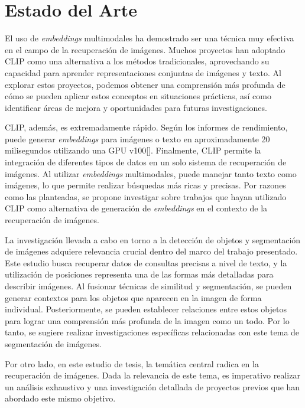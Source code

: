 \chapter{Estado del Arte}\label{chapter:state-of-the-art}

El uso de \textit{embeddings} multimodales ha demostrado ser una técnica muy efectiva en el campo de la recuperaci\'on de im\'agenes. Muchos proyectos han adoptado CLIP como una alternativa a los métodos tradicionales, aprovechando su capacidad para aprender representaciones conjuntas de imágenes y texto. Al explorar estos proyectos, podemos obtener una comprensión más profunda de cómo se pueden aplicar estos conceptos en situaciones prácticas, así como identificar áreas de mejora y oportunidades para futuras investigaciones.

CLIP, además, es extremadamente rápido. Según los informes de rendimiento, puede generar \textit{embeddings} para imágenes o texto en aproximadamente 20 milisegundos utilizando una GPU v100[\cite{BuildingImageClip-20ms}]. Finalmente, CLIP permite la integración de diferentes tipos de datos en un solo sistema de recuperación de imágenes. Al utilizar \textit{embeddings} multimodales, puede manejar tanto texto como imágenes, lo que permite realizar búsquedas más ricas y precisas. Por razones como las planteadas, se propone investigar sobre trabajos que hayan utilizado CLIP como alternativa de generación de \textit{embeddings} en el contexto de la recuperación de imágenes.

La investigación llevada a cabo en torno a la detección de objetos y segmentación de imágenes adquiere relevancia crucial dentro del marco del trabajo presentado. Este estudio busca recuperar datos de consultas precisas a nivel de texto, y la utilización de posiciones representa una de las formas más detalladas para describir imágenes. Al fusionar técnicas de similitud y segmentación, se pueden generar contextos para los objetos que aparecen en la imagen de forma individual. Posteriormente, se pueden establecer relaciones entre estos objetos para lograr una comprensión más profunda de la imagen como un todo. Por lo tanto, se sugiere realizar investigaciones específicas relacionadas con este tema de segmentación de imágenes.

Por otro lado, en este estudio de tesis, la temática central radica en la recuperación de imágenes. Dada la relevancia de este tema, es imperativo realizar un análisis exhaustivo y una investigación detallada de proyectos previos que han abordado este mismo objetivo.


